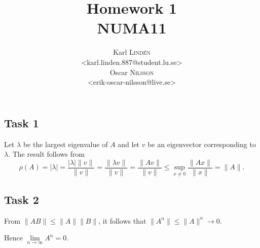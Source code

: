 \documentclass[a4paper,12pt]{article}
\begin{document}
\title{Homework 1 \\ NUMA11}
\author{
  Karl \textsc{Lind\'{e}n} \\
  <karl.linden.887@student.lu.se> \\
  Oscar \textsc{Nilsson} \\
  <erik-oscar-nilsson@live.se>
}

\maketitle
\clearpage


\subsection*{Task 1}

Let \(\lambda\) be the largest eigenvalue of \(A\) and let \(v\) be an
eigenvector corresponding to \(\lambda\).
The result follows from
\[
  \rho(A)
    = |\lambda|
    = \frac{|\lambda|\|v\|}{\|v\|}
    = \frac{\|\lambda v\|}{\|v\|}
    = \frac{\|Av\|}{\|v\|}
    \le \sup_{x \ne 0} \frac{\|Ax\|}{\|x\|}
    = \|A\|.
\]


\subsection*{Task 2}

From $\|AB\| \le \|A\|\|B\|$, it follows that $\|A^n\|\le \|A\|^n \rightarrow 0$. 

Hence $\lim\limits_{n\rightarrow \infty }A^n=0$.
\end{document}
